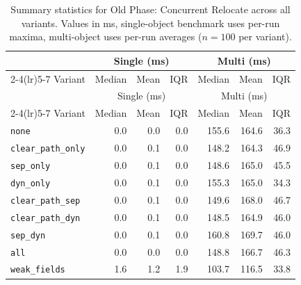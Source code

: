 \begin{longtable}[c]{l rrr rrr}
\caption[Old Phase: Concurrent Relocate summary statistics]{Summary statistics for Old Phase: Concurrent Relocate across all variants. Values in ms, single-object benchmark uses per-run maxima, multi-object uses per-run averages ($n=100$ per variant).}\label{tab:stats-old_relocate} \\
\toprule
 & \multicolumn{3}{c}{Single (ms)} & \multicolumn{3}{c}{Multi (ms)} \\
\cmidrule(lr){2-4}\cmidrule(lr){5-7}
Variant & Median & Mean & IQR & Median & Mean & IQR \\
\midrule
\endfirsthead
\toprule
 & \multicolumn{3}{c}{Single (ms)} & \multicolumn{3}{c}{Multi (ms)} \\
\cmidrule(lr){2-4}\cmidrule(lr){5-7}
Variant & Median & Mean & IQR & Median & Mean & IQR \\
\midrule
\endhead
\bottomrule
\endfoot
\texttt{none} & 0.0 & 0.0 & 0.0 & 155.6 & 164.6 & 36.3 \\
\texttt{clear\_path\_only} & 0.0 & 0.1 & 0.0 & 148.2 & 164.3 & 46.9 \\
\texttt{sep\_only} & 0.0 & 0.1 & 0.0 & 148.6 & 165.0 & 45.5 \\
\texttt{dyn\_only} & 0.0 & 0.1 & 0.0 & 155.3 & 165.0 & 34.3 \\
\texttt{clear\_path\_sep} & 0.0 & 0.1 & 0.0 & 149.6 & 168.0 & 46.7 \\
\texttt{clear\_path\_dyn} & 0.0 & 0.1 & 0.0 & 148.5 & 164.9 & 46.0 \\
\texttt{sep\_dyn} & 0.0 & 0.1 & 0.0 & 160.8 & 169.7 & 46.0 \\
\texttt{all} & 0.0 & 0.0 & 0.0 & 148.8 & 166.7 & 46.3 \\
\texttt{weak\_fields} & 1.6 & 1.2 & 1.9 & 103.7 & 116.5 & 33.8 \\
\end{longtable}
